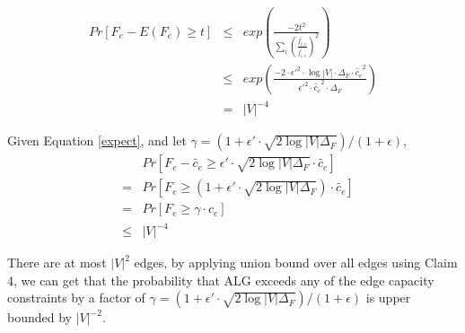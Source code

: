 \documentclass[onecolumn,11pt,journal, compsoc]{IEEEtran}
\begin{document}
\begin{eqnarray}
Pr[F_e - E(F_e) \ge t] &\le& exp(\frac{-2t^2}{\sum_{i}(\frac{\tilde{f_{i,e}}}{\tilde{f_{i,e}}})^2}) \\
&\le& exp(\frac{-2 \cdot \epsilon'^2 \cdot \log|V| \cdot \Delta_F \cdot \tilde{c_e}^2}{\epsilon'^2 \cdot \tilde{c_e}^2 \cdot\Delta_F}) \\
&=& |V|^{-4}
\end{eqnarray}


Given Equation \ref{expect}, and let $\gamma = (1+\epsilon' \cdot \sqrt{2\log|V|\Delta_F})/ (1+\epsilon)$,
\begin{eqnarray}
	&&Pr[F_e - \tilde{c_e} \ge \epsilon' \cdot \sqrt{2\log|V|\Delta_F} \cdot \tilde{c_e}] \\
	&=& Pr[F_e \ge (1+\epsilon' \cdot \sqrt{2\log|V|\Delta_F}) \cdot \tilde{c_e}] \\
	&=& Pr[F_e \ge \gamma \cdot c_e] \\
	&\le& |V|^{-4}
\end{eqnarray}

%

There are at most $|V|^2$ edges, by applying union bound over all edges using Claim 4, we can get that the probability that ALG exceeds any of the edge capacity constraints by a factor of $\gamma = (1+\epsilon' \cdot \sqrt{2\log|V|\Delta_F})/ (1+\epsilon)$ is upper bounded by $|V|^{-2}$.
\end{document}
